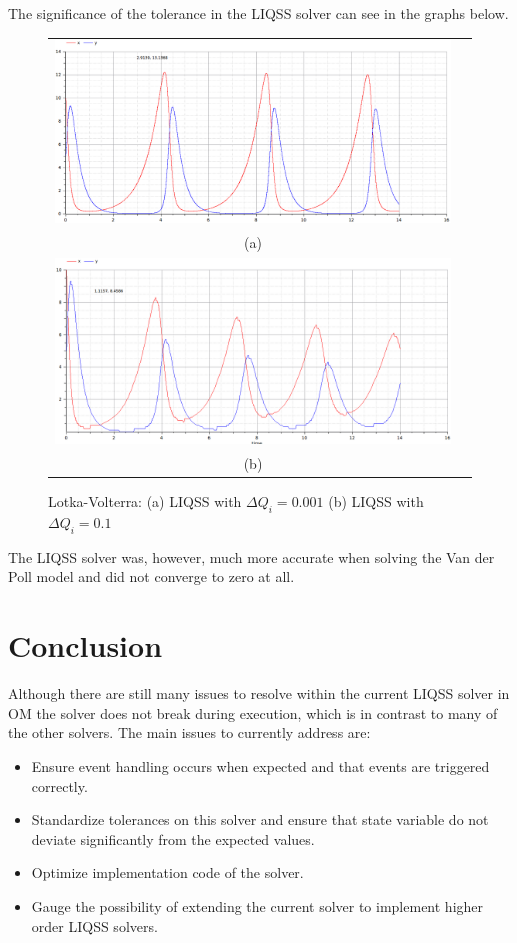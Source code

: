 \documentclass[10pt]{article}
\begin{document}
The significance of the tolerance in the LIQSS solver can see in the graphs below.

\begin{figure}[htbp]
\begin{center}
\begin{tabular}{cc}
		\includegraphics[scale=0.34]{Selection_066.png}	\\	\footnotesize(a)\\	\includegraphics[scale=0.34]{Selection_067.png}\\
	\footnotesize(b)
	\end{tabular}
\end{center}
\vspace{-0.5cm}
\caption{Lotka-Volterra: (a) LIQSS with $\Delta Q_i =0.001$  (b) LIQSS with $\Delta Q_i =0.1$ }
\end{figure}

The LIQSS solver was, however, much more accurate when solving the Van der Poll model and did not converge to zero at all.

\section{Conclusion}

Although there are still many issues to resolve within the current LIQSS solver in OM the solver does not break during execution, which is in contrast to many of the other solvers. The main issues to currently address are:
\begin{itemize}
 \item Ensure event handling occurs when expected and that events are triggered correctly.
 \item Standardize tolerances on this solver and ensure that state variable do not deviate significantly from the expected values.
 \item Optimize implementation code of the solver.
 \item Gauge the possibility of extending the current solver to implement higher order LIQSS solvers.
\end{itemize}
\end{document}
